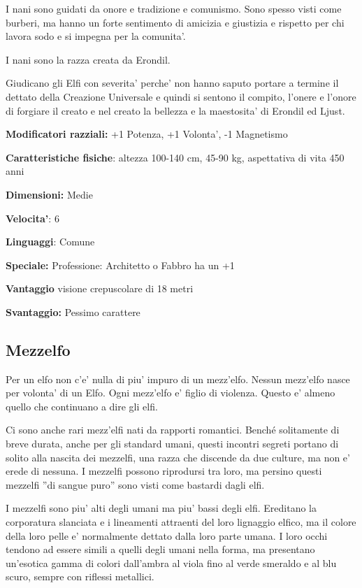 \documentclass[a4paper,11pt,twoside,openany]{book}
\begin{document}
I nani sono guidati da onore e tradizione e comunismo. Sono spesso visti come burberi, ma hanno un forte sentimento di amicizia e giustizia e rispetto per chi lavora sodo e si impegna per la comunita'.

I nani sono la razza creata da Erondil.

Giudicano gli Elfi con severita' perche' non hanno saputo portare a termine il dettato della Creazione Universale e quindi si sentono il compito, l'onere e l'onore di forgiare il creato e nel creato la bellezza e la maestosita' di Erondil ed Ljust. 

\textbf{Modificatori razziali:} +1 Potenza, +1 Volonta', -1 Magnetismo

\textbf{Caratteristiche fisiche}: altezza 100-140 cm, 45-90 kg, aspettativa
di vita 450 anni

\textbf{Dimensioni:} Medie

\textbf{Velocita'}: 6

\textbf{Linguaggi}: Comune

\textbf{Speciale:} Professione: Architetto o Fabbro ha un +1

\textbf{Vantaggio} visione crepuscolare di 18 metri

\textbf{Svantaggio:} Pessimo carattere

\subsection{Mezzelfo}

\label{mezzelfo}

Per un elfo non c'e' nulla di piu' impuro di un mezz'elfo. Nessun mezz'elfo nasce per volonta' di un Elfo. Ogni mezz'elfo e' figlio di violenza. Questo e' almeno quello che continuano a dire gli elfi.

Ci sono anche rari mezz'elfi nati da rapporti romantici. Benché solitamente di breve durata, anche per gli standard umani, questi incontri segreti portano di solito alla nascita dei mezzelfi, una razza che discende da due culture, ma non e' erede di nessuna. I mezzelfi possono riprodursi tra loro, ma persino questi mezzelfi ''di sangue puro'' sono visti come bastardi dagli elfi.

I mezzelfi sono piu' alti degli umani ma piu' bassi degli elfi. Ereditano la corporatura slanciata e i lineamenti attraenti del loro lignaggio elfico, ma il colore della loro pelle e' normalmente dettato dalla loro parte umana. I loro occhi tendono ad essere simili a quelli degli umani nella forma, ma presentano un'esotica gamma di colori dall'ambra al viola fino al verde smeraldo e al blu scuro, sempre con riflessi metallici.
\end{document}
